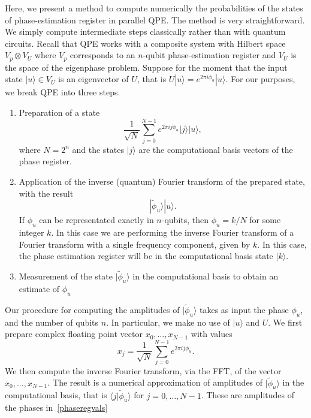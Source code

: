 \documentclass[superscriptaddress,nofootinbib,longbibliography,aps,pre]{revtex4-1}
\newcommand{\ket}[1]{|{#1}\rangle}
\newcommand{\braket}[2]{\langle{#1}|{#2}\rangle}
\begin{document}
Here, we present a method to compute numerically the probabilities
of the states of phase-estimation register in parallel QPE.
The method is very straightforward.
We simply compute intermediate steps classically rather than with quantum circuits.
Recall that QPE works with a composite system with Hilbert space $V_{p}\otimes V_{U}$
where $V_{p}$ corresponds to an $n$-qubit phase-estimation register and $V_{U}$ is
the space of the eigenphase problem.
Suppose for the moment that the input state $\ket{u}\in V_{U}$ is an eigenvector of
$U$, that is $U\ket{u}=e^{2\pi i \phi_{u}}\ket{u}$.
For our purposes, we break QPE into three steps.
%
\begin{enumerate}
\item{Preparation of a state
    \begin{equation}
      \label{aftercontrolledU}
      \frac{1}{\sqrt{N}} \sum_{j=0}^{N-1} e^{2\pi i j \phi_{u}} \ket{j}\ket{u},
    \end{equation}
    where $N=2^{n}$ and the states $\ket{j}$ are the computational basis vectors of the phase register.
  }
\item{Application of the inverse (quantum) Fourier transform of the prepared state, with the result
    \begin{equation}
      \ket{\tilde{\phi}_{u}} \ket{u}.
    \end{equation}
    If $\phi_{u}$ can be representated exactly in $n$-qubits, then $\phi_{u}=k/N$ for some integer $k$.
    In this case we are performing the inverse Fourier transform of a Fourier transform with a single frequency
    component, given by $k$. In this case, the phase estimation register will be in the computational basis state $\ket{k}$.
    }
\item{Measurement of the state $\ket{\tilde{\phi}_{u}}$ in the computational basis to obtain an estimate of $\phi_{u}$}
\end{enumerate}
%
Our procedure for computing the amplitudes of $\ket{\tilde{\phi}_{u}}$
takes as input the phase $\phi_{u}$, and the number of qubits $n$.
In particular, we make no use of $\ket{u}$ and $U$.
We first prepare complex floating point vector $x_{0},\ldots, x_{N-1}$ with values
%
\begin{equation}
  x_{j} = \frac{1}{\sqrt{N}} \sum_{j=0}^{N-1} e^{2\pi i j \phi_{u}}.
\end{equation}
%
We then compute the inverse Fourier transform,
 via the FFT, of the vector $x_{0},\ldots, x_{N-1}$.
The result is a numerical approximation of amplitudes of $\ket{\tilde{\phi}_{u}}$
in the computational basis, that is $\braket{j}{\tilde\phi_{u}}$ for $j=0,\ldots, N-1$.
These are amplitudes of the phases in~\eqref{phaseregvals}
\end{document}
